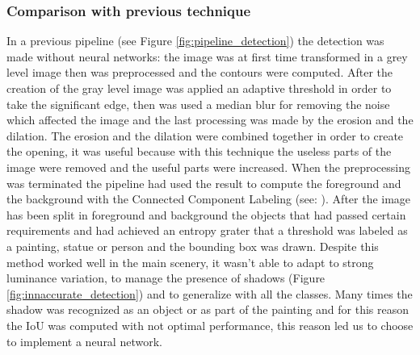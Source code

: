 \subsubsection{Comparison with previous technique}
In a previous pipeline (see Figure \ref{fig:pipeline_detection}) the detection was made without neural networks: the image was at first time transformed in a grey level image then was preprocessed and the contours were computed. After the creation of the gray level image was applied an adaptive threshold in order to take the significant edge, then was used a median blur for removing the noise which affected the image and the last processing was made by the erosion and the dilation.
The erosion and the dilation were combined together in order to create the opening, it was useful because with this technique the useless parts of the image were removed and the useful parts were increased.
When the preprocessing was terminated the pipeline had used the result to compute the foreground and the background with the Connected Component Labeling (see: \cite{Grana_ccl}).
After the image has been split in foreground and background the objects that had passed certain requirements and had achieved an entropy grater that a threshold was labeled as a painting, statue or person and the bounding box was drawn.
Despite this method worked well in the main scenery, it wasn't able to adapt to strong luminance variation, to manage the presence of shadows (Figure \ref{fig:innaccurate_detection}) and to generalize with all the classes. Many times the shadow was recognized as an object or as part of the painting and for this reason the IoU was computed with not optimal performance, this reason led us to choose to implement a neural network.

